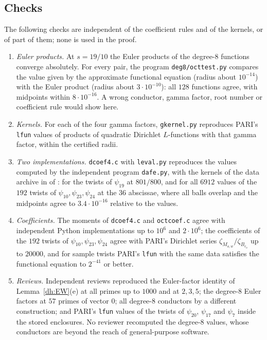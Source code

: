 \subsection{Checks}\label{lv:checks}
The following checks are independent of the coefficient rules and of the
kernels, or of part of them; none is used in the proof.
\begin{enumerate}
\item[(1)] \emph{Euler products.} At $s=19/10$ the Euler products of the
 degree-$8$ functions converge absolutely. For every pair, the program
 \texttt{deg8/octtest.py} compares the value given by the approximate
 functional equation (radius about $10^{-14}$) with the Euler product
 (radius about $3\cdot10^{-10}$): all $128$ functions agree, with midpoints
 within $8\cdot10^{-16}$. A wrong conductor, gamma factor, root number or
 coefficient rule would show here.
\item[(2)] \emph{Kernels.} For each of the four gamma factors, \texttt{gkernel.py}
 reproduces PARI's \texttt{lfun} values of products of quadratic Dirichlet
 $L$-functions with that gamma factor, within the certified radii.
\item[(3)] \emph{Two implementations.} \texttt{dcoef4.c} with
 \texttt{leval.py} reproduces the values computed by the independent
 program \texttt{dafe.py}, with the kernels of the data archive in
  of \cite{NaslundCode4317}: for the twists of
 $\psi_{19}$ at $801/800$, and for all $6912$ values of the $192$ twists of
 $\psi_{10},\psi_{23},\psi_{24}$ at the $36$ abscissae, where all balls overlap
 and the midpoints agree to $3.4\cdot10^{-16}$ relative to the values.
\item[(4)] \emph{Coefficients.} The moments of \texttt{dcoef4.c} and
 \texttt{octcoef.c} agree with independent Python implementations up to
 $10^6$ and $2\cdot10^6$; the coefficients of the $192$ twists of
 $\psi_{10},\psi_{23},\psi_{24}$ agree with PARI's Dirichlet series
 $\zeta_{M_{o,w}}/\zeta_{B_{c_o}}$ up to $20000$, and for sample twists PARI's
 \texttt{lfun} with the same data satisfies the functional equation to
 $2^{-41}$ or better.
\item[(5)] \emph{Reviews.} Independent reviews reproduced the Euler-factor
 identity of Lemma~\ref{dh:EW}(e) at all primes up to $1000$ and at $2,3,5$;
 the degree-$8$ Euler factors at $57$ primes of vector $0$; all degree-$8$
 conductors by a different construction; and PARI's \texttt{lfun} values of
 the twists of $\psi_{20}$, $\psi_{17}$ and $\psi_7$ inside the stored
 enclosures. No reviewer recomputed the degree-$8$ values, whose conductors
 are beyond the reach of general-purpose software.
\end{enumerate}


